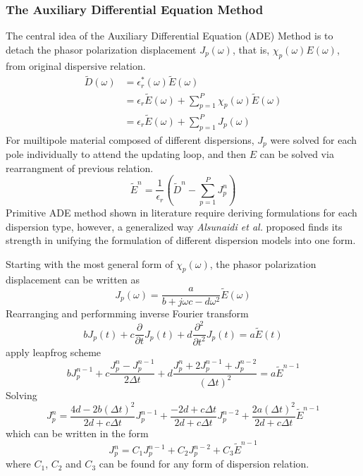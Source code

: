 \subsubsection{The Auxiliary Differential Equation Method}
The central idea of the Auxiliary Differential Equation (ADE) Method is to detach the phasor polarization displacement
$J_p(\omega)$, that is, $\chi_p(\omega)E(\omega)$, from original dispersive relation.
\begin{equation}
  \begin{split}
    \widetilde{D}(\omega) &= \epsilon_r^*(\omega)\widetilde{E}(\omega)\\
    & = \epsilon_r\widetilde{E}(\omega) + \sum_{p=1}^P\chi_p(\omega)\widetilde{E}(\omega)\\
    & = \epsilon_r\widetilde{E}(\omega) + \sum_{p=1}^{P}J_p(\omega)
  \end{split}
\end{equation}
For muiltipole material composed of different dispersions, $J_p$ were solved for each pole individually to attend the
updating loop, and then $E$ can be solved via rearrangment of previous relation.
\begin{equation}
  \widetilde{E}^n = \frac{1}{\epsilon_r}\left(\widetilde{D}^n - \sum_{p=1}^PJ_p^n\right)
\end{equation}
Primitive ADE method shown in literature require deriving formulations for each dispersion type, however, a generalized
way \textit{Alsunaidi et al.} proposed finds its strength in unifying the formulation of different dispersion models
into one form.

Starting with the most general form of $\chi_p(\omega)$, the phasor polarization displacement can be written
as
\begin{equation}
  J_p(\omega) = \frac{a}{b + j\omega c - d\omega^2}\widetilde{E}(\omega)
\end{equation}
Rearranging and performming inverse Fourier transform 
\begin{equation}
  bJ_p(t) + c \frac{\partial}{\partial t}J_p(t) + d \frac{\partial ^2}{\partial t^2}J_p(t) = a\widetilde{E}(t)
\end{equation}
apply leapfrog scheme 
\begin{equation}
  bJ_p^{n-1} + c \frac{J_p^n - J_p^{n-1}}{2\Delta t} + d \frac{J_p^n + 2J_p^{n-1} + J_p^{n-2}}{(\Delta t)^2} = a\widetilde{E}^{n-1}
\end{equation}
Solving 
\begin{equation}
  J_p^n = \frac{4d-2b(\Delta t)^2}{2d+c\Delta t}J_p^{n-1} + \frac{-2d+c\Delta t}{2d+c\Delta t}J_p^{n-2} + \frac{2a(\Delta t)^2}{2d+c\Delta t}\widetilde{E}^{n-1}
\end{equation}
which can be written in the form 
\begin{equation}
  J_p^n = C_1 J_p^{n-1} + C_2 J_p^{n-2} + C_3 \widetilde{E}^{n-1}
\end{equation}
where $C_1$, $C_2$ and $C_3$ can be found for any form of dispersion relation.



